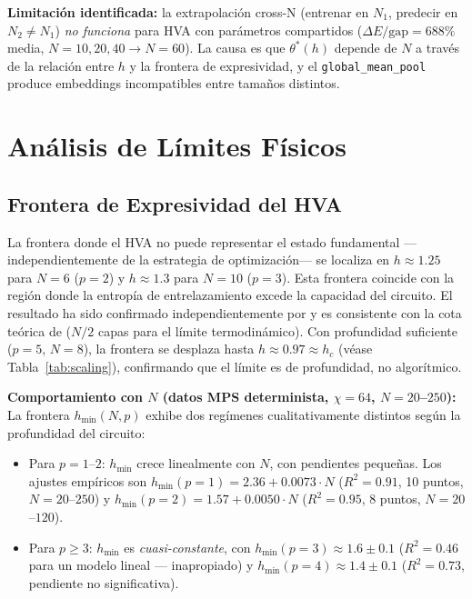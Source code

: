 \documentclass[11pt,a4paper,spanish]{book}
\begin{document}
\textbf{Limitación identificada:} la extrapolación cross-N (entrenar en $N_1$, predecir en $N_2 \neq N_1$) \emph{no funciona} para HVA con parámetros compartidos ($\Delta E/\text{gap} = 688\%$ media, $N = 10, 20, 40 \to N = 60$). La causa es que $\theta^*(h)$ depende de $N$ a través de la relación entre $h$ y la frontera de expresividad, y el \texttt{global\_mean\_pool} produce embeddings incompatibles entre tamaños distintos.

\section{Análisis de Límites Físicos}

\subsection{Frontera de Expresividad del HVA}

La frontera donde el HVA no puede representar el estado fundamental ---independientemente de la estrategia de optimización--- se localiza en $h \approx 1.25$ para $N = 6$ ($p = 2$) y $h \approx 1.3$ para $N = 10$ ($p = 3$). Esta frontera coincide con la región donde la entropía de entrelazamiento excede la capacidad del circuito. El resultado ha sido confirmado independientemente por \citet{tripathi2026} y es consistente con la cota teórica de \citet{sumeet2025} ($N/2$ capas para el límite termodinámico). Con profundidad suficiente ($p = 5$, $N = 8$), la frontera se desplaza hasta $h \approx 0.97 \approx h_c$ (véase Tabla~\ref{tab:scaling}), confirmando que el límite es de profundidad, no algorítmico.

\textbf{Comportamiento con $N$ (datos MPS determinista, $\chi = 64$, $N = 20$--$250$):} La frontera $h_{\min}(N, p)$ exhibe dos regímenes cualitativamente distintos según la profundidad del circuito:

\begin{itemize}
    \item Para $p = 1$--$2$: $h_{\min}$ crece linealmente con $N$, con pendientes pequeñas. Los ajustes empíricos son $h_{\min}(p{=}1) = 2.36 + 0.0073 \cdot N$ ($R^2 = 0.91$, 10 puntos, $N = 20$--$250$) y $h_{\min}(p{=}2) = 1.57 + 0.0050 \cdot N$ ($R^2 = 0.95$, 8 puntos, $N = 20$--$120$).
    \item Para $p \geq 3$: $h_{\min}$ es \emph{cuasi-constante}, con $h_{\min}(p{=}3) \approx 1.6 \pm 0.1$ ($R^2 = 0.46$ para un modelo lineal --- inapropiado) y $h_{\min}(p{=}4) \approx 1.4 \pm 0.1$ ($R^2 = 0.73$, pendiente no significativa).
\end{itemize}
\end{document}
